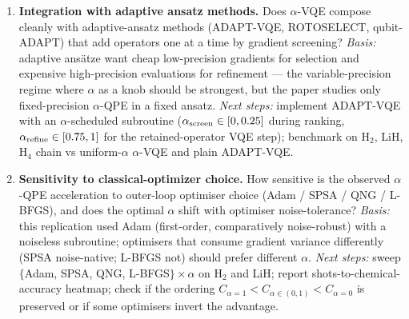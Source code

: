 \begin{enumerate}
\item \textbf{Integration with adaptive ansatz methods.} Does $\alpha$-VQE
compose cleanly with adaptive-ansatz methods (ADAPT-VQE, ROTOSELECT,
qubit-ADAPT) that add operators one at a time by gradient screening?
\textit{Basis:} adaptive ans\"atze want cheap low-precision gradients for
selection and expensive high-precision evaluations for refinement --- the
variable-precision regime where $\alpha$ as a knob should be strongest, but
the paper studies only fixed-precision $\alpha$-QPE in a fixed ansatz.
\textit{Next steps:} implement ADAPT-VQE with an $\alpha$-scheduled
subroutine ($\alpha_{\rm screen}\in[0, 0.25]$ during ranking,
$\alpha_{\rm refine}\in[0.75, 1]$ for the retained-operator VQE step);
benchmark on H$_2$, LiH, H$_4$ chain vs uniform-$\alpha$ $\alpha$-VQE and
plain ADAPT-VQE.

\item \textbf{Sensitivity to classical-optimizer choice.} How sensitive is the
observed $\alpha$-QPE acceleration to outer-loop optimiser choice
(Adam / SPSA / QNG / L-BFGS), and does the optimal $\alpha$ shift with
optimiser noise-tolerance? \textit{Basis:} this replication used Adam
(first-order, comparatively noise-robust) with a noiseless subroutine;
optimisers that consume gradient variance differently (SPSA noise-native;
L-BFGS not) should prefer different $\alpha$.
\textit{Next steps:} sweep $\{$Adam, SPSA, QNG, L-BFGS$\}\times\alpha$ on H$_2$
and LiH; report shots-to-chemical-accuracy heatmap; check if the ordering
$C_{\alpha{=}1} < C_{\alpha\in(0,1)} < C_{\alpha{=}0}$ is preserved or if some
optimisers invert the advantage.
\end{enumerate}
